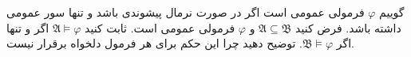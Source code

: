 گوییم 
$\varphi$
فرمولی عمومی است اگر در صورت نرمال پیشوندی باشد و تنها سور عمومی داشته باشد. فرض کنید
$\mathfrak{A}\subseteq\mathfrak{B}$
و
$\varphi$
فرمولی عمومی است. ثابت کنید 
$\mathfrak{A}\models\varphi$
اگر و تنها اگر 
$\mathfrak{B}\models\varphi$. توضیح دهید چرا این حکم برای هر فرمول دلخواه برقرار نیست.